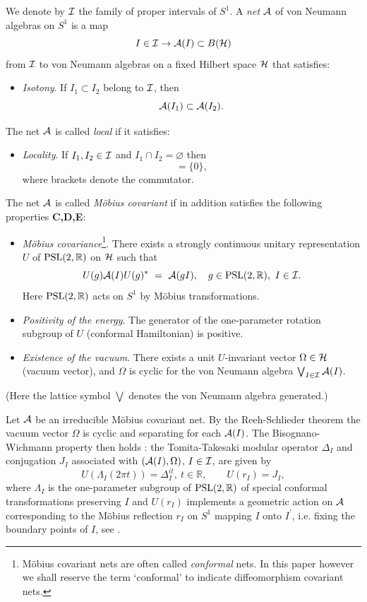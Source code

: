 \documentclass[12pt]{article}
\def\Om{\Omega}
\def\emptyset{\varnothing}
\def\PSL{{{\rm PSL}(2,\mathbb R)}}
\def\A{{\cal A}}
\def\I{{\cal I}}
\def\H{{\cal H}}
\begin{document}
We denote by $\I$ the family of proper intervals of $S^1$. 
A {\it net} $\A$ of von Neumann algebras on $S^1$ is a map 
$$
I\in\I\to\A(I)\subset B(\H)
$$
from $\I$ to von Neumann algebras on a fixed Hilbert space $\H$
that satisfies:
\begin{itemize}
\item[{\bf A.}] {\it Isotony}. If $I_{1}\subset I_{2}$ belong to $\I$, then
\begin{equation*}
 \A(I_{1})\subset\A(I_{2}).
\end{equation*}
\end{itemize}
The net $\A$ is called {\it local} if it satisfies:
\begin{itemize}
\item[{\bf B.}] {\it Locality}. If $I_{1},I_{2}\in\I$ and $I_1\cap 
I_2=\emptyset$ then 
\begin{equation*}
 [\A(I_{1}),\A(I_{2})]=\{0\},
 \end{equation*}
where brackets denote the commutator.
\end{itemize}
The net $\A$ is called {\it M\"{o}bius covariant} if in addition satisfies
the following properties {\bf C,D,E}:
\begin{itemize}
\item[{\bf C.}] {\it M\"{o}bius covariance}\footnote{M\"{o}bius 
covariant nets are often called {\it conformal} nets. In this paper 
however we shall reserve the term `conformal' to indicate 
diffeomorphism covariant nets.}. 
There exists a strongly 
continuous unitary representation $U$ of $\PSL$ on $\H$ such that
\begin{equation*}
 U(g)\A(I) U(g)^*\ =\ \A(gI),\quad g\in\PSL,\ I\in\I.
\end{equation*}
Here $\PSL$ acts on $S^1$ by M\" obius transformations.
\item[{\bf D.}] {\it Positivity of the energy}. The generator of the 
one-parameter rotation subgroup of $U$ (conformal Hamiltonian) is positive. 
\item[{\bf E.}] {\it Existence of the vacuum}. There exists a unit 
$U$-invariant vector $\Omega\in\H$ (vacuum vector), and $\Omega$ 
is cyclic for the von Neumann algebra $\bigvee_{I\in\I}\A(I)$.
\end{itemize}
(Here the lattice symbol $\bigvee$ denotes the von Neumann algebra 
generated.)

Let $\A$ be an irreducible M\"{o}bius covariant net. By the Reeh-Schlieder 
theorem the vacuum vector $\Om$ is cyclic and separating for each 
$\A(I)$. The Bisognano-Wichmann property then holds 
\cite{BGL,FG}: the Tomita-Takesaki modular operator $\Delta_I$ and 
conjugation $J_I$ associated with $(\A(I),\Omega)$, $I\in\I$, 
are given by 
\begin{equation}\label{BW} 
U(\Lambda_I (2\pi 
t))=\Delta_{I}^{it},\ t\in\mathbb R,\qquad U(r_I)= J_I, 
\end{equation} 
where $\Lambda_I$ is the one-parameter subgroup of $\PSL$ of special 
conformal transformations preserving $I$ and $U(r_I)$ implements a 
geometric action on $\A$ corresponding to the M\" obius reflection $r_I$ on 
$S^1$ mapping $I$ onto $I^\prime$, i.e. fixing the boundary points of 
$I$, see \cite{BGL}.
\end{document}
